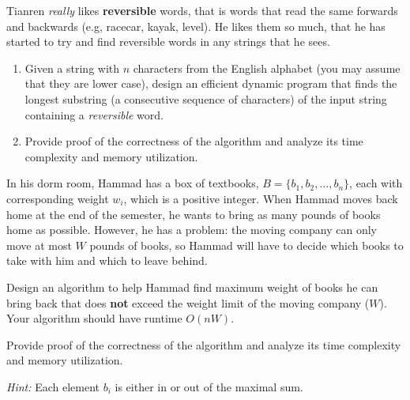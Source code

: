 \documentclass{common/cs157}
\begin{document}
\homeworkhandin 

\begin{problem}{1}
Tianren \textit{really} likes \textbf{reversible} words, that is words that read the same forwards and backwards (e.g, racecar, kayak, level). He likes them so much, that he has started to try and find reversible words in any strings that he sees.

\begin{enumerate}
    \item Given a string with $n$ characters from the English alphabet (you may assume that they are lower case), design an efficient dynamic program that finds the longest substring (a consecutive sequence of characters) of the input string containing a \textit{reversible} word.
    \item Provide proof of the correctness of the algorithm and analyze its time complexity and memory utilization.
\end{enumerate}
\end{problem}

\newpage

\begin{problem}{2}
In his dorm room, Hammad has a box of textbooks, $B = \{ b_1, b_2, \ldots, b_n \}$, each with corresponding weight $w_i$, which is a positive integer. When Hammad moves back home at the end of the semester, he wants to bring as many pounds of books home as possible. However, he has a problem: the moving company can only move at most $W$ pounds of books, so Hammad will have to decide which books to take with him and which to leave behind.

Design an algorithm to help Hammad find maximum weight of books he can bring back that does \textbf{not} exceed the weight limit of the moving company ($W$). Your algorithm should have runtime $O(nW)$. 

Provide proof of the correctness of the algorithm and analyze its time complexity and memory utilization.

\textit{Hint:}  Each element $b_i$ is either in or out of the maximal sum.

\end{problem}

\newpage
\end{document}
